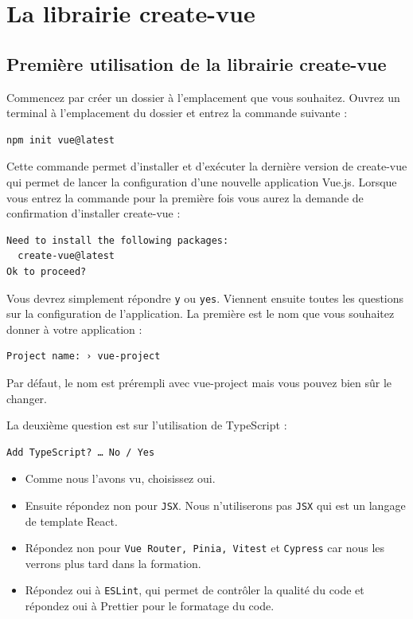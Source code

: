 \section{La librairie create-vue}
\subsection{Première utilisation de la librairie {\color{monOrange} create-vue}}
Commencez par créer un dossier à l'emplacement que vous souhaitez. Ouvrez un terminal à l'emplacement du dossier et entrez la commande suivante :
\begin{verbatim}
npm init vue@latest
\end{verbatim}

Cette commande permet d'installer et d'exécuter la dernière version de {\color{monOrange}create-vue} qui permet de lancer la configuration d'une nouvelle application {\color{monOrange} Vue.js}. Lorsque vous entrez la commande pour la première fois vous aurez la demande de confirmation d'installer {\color{monOrange}create-vue }:
\begin{verbatim}
Need to install the following packages:
  create-vue@latest
Ok to proceed?
\end{verbatim}

Vous devrez simplement répondre {\tt y} ou {\tt yes}. Viennent ensuite toutes les questions sur la configuration de l'application. La première est le nom que vous souhaitez donner à votre application :
\begin{verbatim}
Project name: › vue-project
\end{verbatim}

Par défaut, le nom est prérempli avec vue-project mais vous pouvez bien sûr le changer.

La deuxième question est sur l'utilisation de TypeScript :
\begin{verbatim}
Add TypeScript? … No / Yes
\end{verbatim}
\begin{itemize}
\item Comme nous l'avons vu, choisissez {\color{blue} oui}.
\item Ensuite répondez {\color{blue} non} pour {\tt JSX}. Nous n'utiliserons pas {\tt JSX} qui est un langage de template React.
\item Répondez {\color{blue} non} pour {\tt Vue Router, Pinia, Vitest} et {\tt Cypress} car nous les verrons plus tard dans la formation.
\item Répondez {\color{blue} oui} à {\tt ESLint}, qui permet de contrôler la qualité du code et répondez oui à Prettier pour le formatage du code.
\end{itemize}


